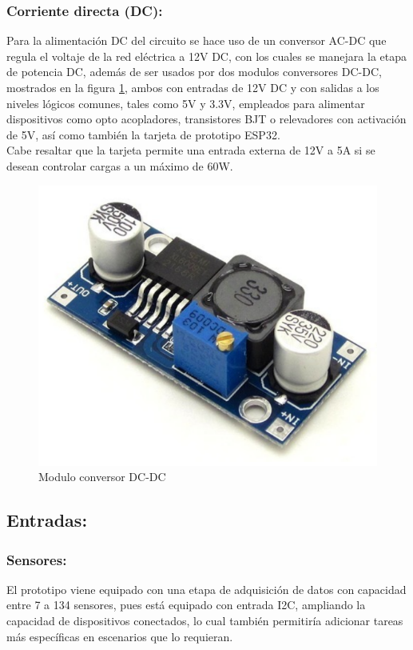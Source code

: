 	\subsubsection{Corriente directa (DC):}
		Para la alimentación DC del circuito se hace uso de un conversor AC-DC que regula el voltaje de la red eléctrica a 12V DC, con los cuales se manejara la etapa de potencia DC, además de ser usados por dos modulos conversores DC-DC, mostrados en la figura \ref{fig:DCDC}, ambos con entradas de 12V DC y con salidas a los niveles lógicos comunes, tales como 5V y 3.3V, empleados para alimentar dispositivos como opto acopladores,  transistores BJT o relevadores con activación de 5V, así como también la tarjeta de 	prototipo ESP32.\\
		
		Cabe resaltar que la tarjeta permite una entrada externa de 12V a 5A si se desean controlar cargas a un máximo de 60W.\\
			
		\begin{figure}[H]
			\centering
			\caption{Modulo conversor DC-DC \cite{DCDC}}
			\label{fig:DCDC}
			\includegraphics[width=0.5\linewidth]{Imagenes/DCDC}
		\end{figure}
	
	\subsection{Entradas:}
	\subsubsection{Sensores:}
		El prototipo viene equipado con una etapa de adquisición de datos con capacidad entre 7 a 134 sensores, pues está equipado con entrada I2C, ampliando la capacidad de dispositivos conectados, lo cual también permitiría adicionar tareas más específicas en escenarios que lo requieran.\\
		

